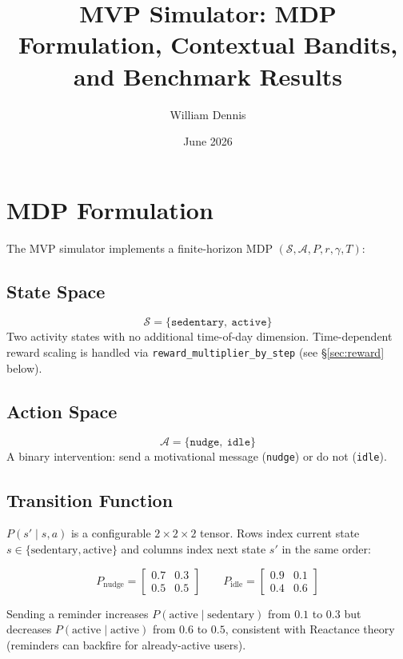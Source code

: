 \documentclass[11pt]{article}
\title{MVP Simulator: MDP Formulation, Contextual Bandits, and Benchmark Results}
\author{William Dennis}
\date{June 2026}
\begin{document}
\maketitle

\section{MDP Formulation}

The MVP simulator implements a finite-horizon MDP $(\mathcal{S}, \mathcal{A}, P, r, \gamma, T)$:

\subsection{State Space}
\[
\mathcal{S} = \{\texttt{sedentary},\ \texttt{active}\}
\]
Two activity states with no additional time-of-day dimension. Time-dependent reward scaling is handled via \texttt{reward\_multiplier\_by\_step} (see \S\ref{sec:reward} below).

\subsection{Action Space}
\[
\mathcal{A} = \{\texttt{nudge},\ \texttt{idle}\}
\]
A binary intervention: send a motivational message (\texttt{nudge}) or do not (\texttt{idle}).

\subsection{Transition Function}

$P(s' \mid s, a)$ is a configurable $2 \times 2 \times 2$ tensor. Rows index current state $s \in \{\text{sedentary}, \text{active}\}$ and columns index next state $s'$ in the same order:

\[
P_{\text{nudge}} =
\begin{bmatrix}
0.7 & 0.3 \\[2pt]
0.5 & 0.5
\end{bmatrix}
\qquad
P_{\text{idle}} =
\begin{bmatrix}
0.9 & 0.1 \\[2pt]
0.4 & 0.6
\end{bmatrix}
\]

Sending a reminder increases $P(\text{active} \mid \text{sedentary})$ from $0.1$ to $0.3$ but decreases $P(\text{active} \mid \text{active})$ from $0.6$ to $0.5$, consistent with Reactance theory (reminders can backfire for already-active users).
\end{document}
